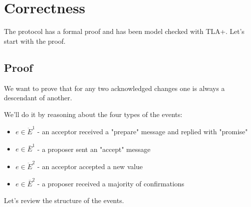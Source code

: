 \documentclass[a4paper,USenglish]{lipics-v2018}
\theoremstyle{definition}
\begin{document}
\section{Correctness}

The protocol has a formal proof and has been model checked with TLA+. Let's start with the proof.

\subsection{Proof}

We want to prove that for any two acknowledged changes one is always a descendant of another.

\newpage

We'll do it by reasoning about the four types of the events:

\begin{itemize}
    \item $e \in \ddot{E}^1$ - an acceptor received a "prepare" message and replied with "promise"
    \item $e \in \bar{E}^1$ - a proposer sent an "accept" message
    \item $e \in \ddot{E}^2$ - an acceptor accepted a new value
    \item $e \in \bar{E}^2$ - a proposer received a majority of confirmations
\end{itemize}

Let's review the structure of the events.
\end{document}

